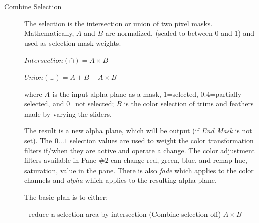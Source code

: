 \begin{description}
    \item[Combine Selection] The selection is the intersection or union of two pixel masks. Mathematically, $A$ and $B$ are normalized, (scaled to between $0$ and $1$) and used as selection mask weights.
    
    $Intersection (\cap) = A\times B$
    
    $Union (\cup)= A+B-A\times B$
    
    where $A$ is the input alpha plane as a mask, $1$=selected, $0.4$=partially selected, and $0$=not selected; $B$ is the color selection of trims and feathers made by varying the sliders.
    
    The result is a new alpha plane, which will be output (if \textit{End Mask} is not set). The $0\dots1$ selection values are used to weight the color transformation filters if/when they are active and operate a change. The color adjustment filters available in Pane \#$2$ can change red, green, blue, and remap hue, saturation, value in the pane. There is also \textit{fade} which applies to the color channels and \textit{alpha} which applies to the resulting alpha plane.
    
    The basic plan is to either:
    
    - reduce a selection area by intersection (Combine selection off) $A \times B$
    

\end{description}
